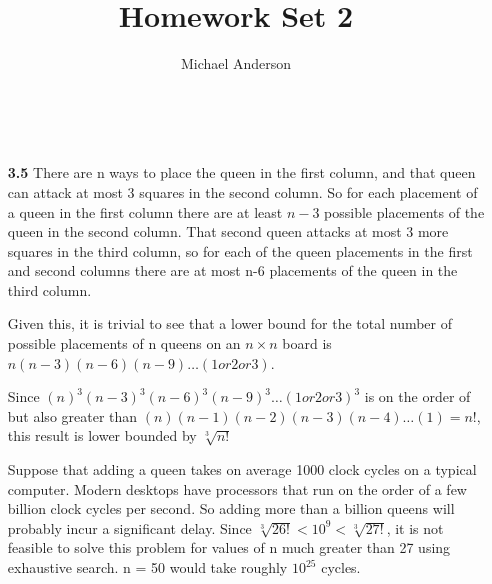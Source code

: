 \documentclass{article}
\author{Michael Anderson}
\title{Homework Set 2}
\begin{document}
\maketitle
{}
\\
\flushleft
\begin{enumerate}
\item[\textbf{3.5}] There are n ways to place the queen in the first column, and that queen can attack
at most 3 squares in the second column. So for each placement of a queen in the first column
there are at least $n-3$ possible placements of the queen in the second column. That second
queen attacks at most 3 more squares in the third column, so for each of the queen placements
in the first and second columns there are at most n-6 placements of the queen in the third
column.

Given this, it is trivial to see that a lower bound for the total number of possible placements
of n queens on an $n \times n$ board is $n(n-3)(n-6)(n-9) \ldots (1or2or3)$.

Since $(n)^3(n-3)^3(n-6)^3(n-9)^3 \ldots (1or2or3)^3$ is on the order of but also greater than 
$(n)(n-1)(n-2)(n-3)(n-4) \ldots (1)=n!$, this result is lower bounded by $\sqrt[3]{n!}$

Suppose that adding a queen takes on average 1000 clock cycles on a typical computer. Modern
desktops have processors that run on the order of a few billion clock cycles per second. So
adding more than a billion queens will probably incur a significant delay. Since
$\sqrt[3]{26!} < 10^9 < \sqrt[3]{27!}$, it is not feasible to solve this problem for values of
n much greater than 27 using exhaustive search. n = 50 would take roughly $10^{25}$ cycles.


\end{enumerate}
\end{document}
